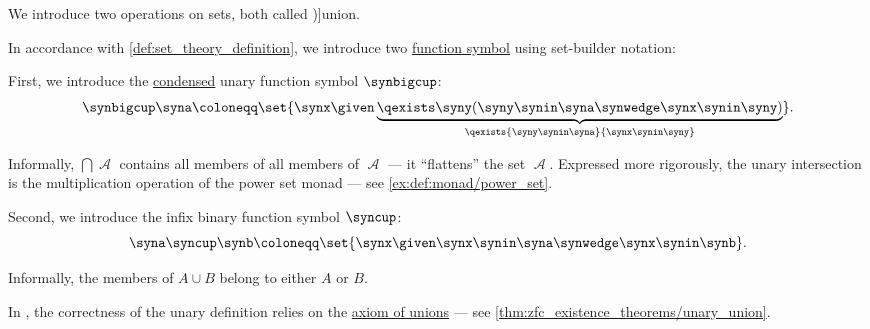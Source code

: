 \begin{definition}\label{def:set_union}
  We introduce two operations on sets, both called \term[ru=объединение (\cite[6]{ШеньВерещагин2020НачалаТеорииМножеств})]{union}.

  In accordance with \cref{def:set_theory_definition}, we introduce two \hyperref[def:fol_signature/function]{function symbol} using set-builder notation:
  \begin{thmenum}
     First, we introduce the \hyperref[def:fol_signature/notation]{condensed} unary function symbol \( {\synbigcup} \):
    \begin{equation*}
      \synbigcup \syna \coloneqq \set{ \synx \given \underbrace{\qexists \syny (\syny \synin \syna \synwedge \synx \synin \syny)}_{\qexists {\syny \synin \syna} {\synx \synin \syny}} }.
    \end{equation*}

    Informally, \( \bigcap \mscrA \) contains all members of all members of \( \mscrA \) --- it \enquote{flattens} the set \( \mscrA \). Expressed more rigorously, the unary intersection is the multiplication operation of the power set monad --- see \cref{ex:def:monad/power_set}.

     Second, we introduce the infix binary function symbol \( {\syncup} \):
    \begin{equation*}
      \syna \syncup \synb \coloneqq \set{ \synx \given \synx \synin \syna \synwedge \synx \synin \synb }.
    \end{equation*}

    Informally, the members of \( A \cup B \) belong to either \( A \) or \( B \).
  \end{thmenum}
\end{definition}
\begin{comments}
  \item In \hyperref[def:zfc]{}, the correctness of the unary definition relies on the \hyperref[def:zfc/union]{axiom of unions} --- see \cref{thm:zfc_existence_theorems/unary_union}.
\end{comments}

